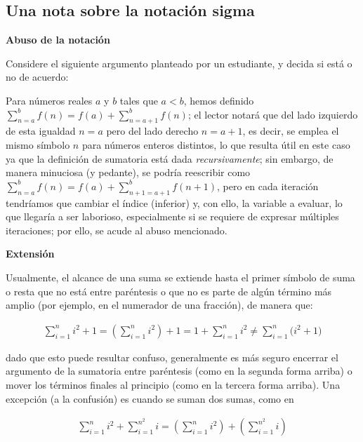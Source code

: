
\subsection*{Una nota sobre la notación sigma}

\textbf{Abuso de la notación}

Considere el siguiente argumento planteado por un estudiante, y decida si está o no de acuerdo:

Para números reales $a$ y $b$ tales que $a<b$, hemos definido $\sum_{n=a}^{b} f(n) = f(a) + \sum_{n=a+1}^{b}f(n)$; el lector notará que del lado izquierdo de esta igualdad $n=a$ pero del lado derecho $n=a+1$, es decir, se emplea el mismo símbolo $n$ para números enteros distintos, lo que resulta útil en este caso ya que la definición de sumatoria está dada \textit{recursivamente}; sin embargo, de manera minuciosa (y pedante), se podría reescribir como $\sum_{n=a}^{b}f(n) = f(a) + \sum_{n+1=a+1}^{b}f(n+1)$, pero en cada iteración tendríamos que cambiar el índice (inferior) y, con ello, la variable a evaluar, lo que llegaría a ser laborioso, especialmente si se requiere de expresar múltiples iteraciones; por ello, se acude al abuso mencionado.

\textbf{Extensión}

Usualmente, el alcance de una suma se extiende hasta el primer símbolo de suma o resta que no está entre paréntesis o que no es parte de algún término más amplio (por ejemplo, en el numerador de una fracción), de manera que:

\begin{align*}
  \sum_{i=1}^{n} i^2 + 1 = \left(\sum_{i=1}^{n}i^2\right) + 1 = 1 + \sum_{i=1}^{n} i^2 \neq \sum_{i=1}^{n} \bigl(i^2+1\bigr)
\end{align*}

dado que esto puede resultar confuso, generalmente es más seguro encerrar el argumento de la sumatoria entre paréntesis (como en la segunda forma arriba) o mover los términos finales al principio (como en la tercera forma arriba). Una excepción (a la confusión) es cuando se suman dos sumas, como en

\begin{align*}
  \sum_{i=1}^{n} i^2 + \sum_{i=1}^{n^2} i = \left(\sum_{i=1}^{n}i^2\right) + \left(\sum_{i=1}^{n^2}i\right)
\end{align*}
